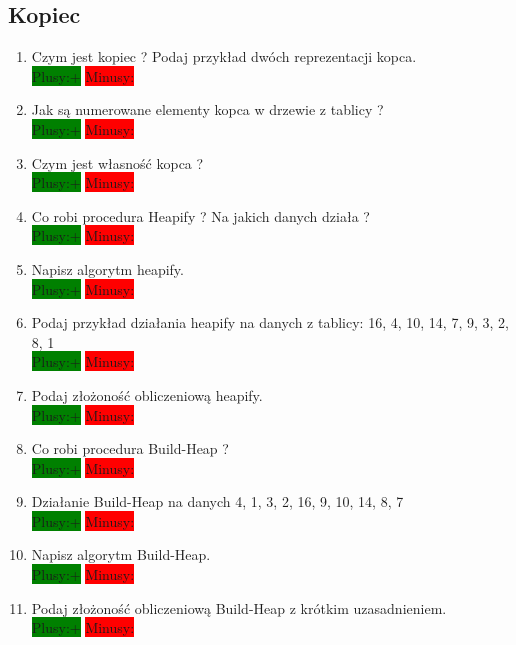\documentclass[a4paper,11pt]{article}
\begin{document}
\subsection{Kopiec}
\begin{enumerate}
\item Czym jest kopiec ? Podaj przykład dwóch reprezentacji kopca. 
\\  \colorbox{green}{Plusy:+} \colorbox{red}{Minusy: }

\item Jak są numerowane elementy kopca w drzewie z tablicy ?\\  \colorbox{green}{Plusy:+} \colorbox{red}{Minusy: }

\item Czym jest własność kopca ?\\  \colorbox{green}{Plusy:+} \colorbox{red}{Minusy: }

\item Co robi procedura Heapify ? Na jakich danych działa ? \\  \colorbox{green}{Plusy:+} \colorbox{red}{Minusy: }

\item Napisz algorytm heapify.\\  
\colorbox{green}{Plusy:+} \colorbox{red}{Minusy: }

\item Podaj przykład działania heapify na danych z tablicy: 16, 4, 10, 14, 7, 9, 3, 2, 8, 1 \\  
\colorbox{green}{Plusy:+} \colorbox{red}{Minusy: }

\item Podaj złożoność obliczeniową heapify.\\  
\colorbox{green}{Plusy:+} \colorbox{red}{Minusy: }

\item Co robi procedura Build-Heap ? \\  
\colorbox{green}{Plusy:+} \colorbox{red}{Minusy: }

\item Działanie Build-Heap na danych 4, 1, 3, 2, 16, 9, 10, 14, 8, 7\\  
\colorbox{green}{Plusy:+} \colorbox{red}{Minusy: }

\item Napisz algorytm Build-Heap.\\  
\colorbox{green}{Plusy:+} \colorbox{red}{Minusy: }

\item Podaj złożoność obliczeniową Build-Heap z krótkim uzasadnieniem. \\  
\colorbox{green}{Plusy:+} \colorbox{red}{Minusy: }


\end{enumerate}
\end{document}

